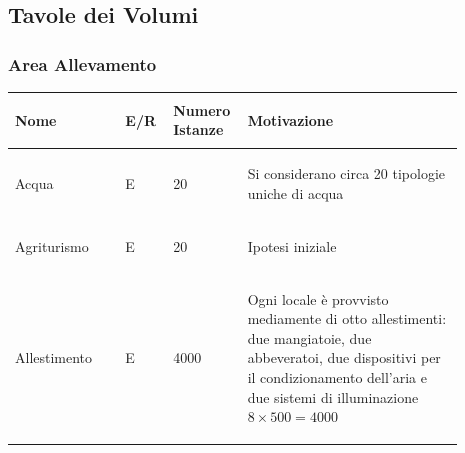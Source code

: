 \documentclass[12pt,a4paper]{article}
\begin{document}
\subsection{Tavole dei Volumi}
\label{sec:volumi}


\subsubsection{Area Allevamento}
\begin{center}
\setlength{\extrarowheight}{1.5pt}
\begin{longtable}{|p{0.23\linewidth}|p{0.1\linewidth}|p{0.11\linewidth}|p{0.45\linewidth}|}
\hline \textbf{Nome} 	& \begin{center}\vspace{-15pt}\textbf{E/R}\end{center} & \textbf{Numero Istanze} & \textbf{Motivazione}\\ 

    
\hline
Acqua 				& \begin{center}
\vspace{-25pt}E
\end{center}
					& \begin{center}
					\vspace{-25pt}20\end{center}
					& \begin{flushleft}\vspace{-25pt} Si considerano circa 20 tipologie uniche di acqua \end{flushleft}\\ 

\hline
Agriturismo 				& \begin{center}
\vspace{-25pt}E
\end{center}
					& \begin{center}
					\vspace{-25pt}20
					\end{center}
					& \begin{flushleft}\vspace{-25pt} Ipotesi iniziale \end{flushleft}\\ 

\hline
Allestimento 				& \begin{center}
\vspace{-25pt}E
\end{center}
					& \begin{center}
					\vspace{-25pt}4000\end{center}
					& \begin{flushleft}\vspace{-25pt} Ogni locale è provvisto mediamente di otto allestimenti: due mangiatoie, due abbeveratoi, due dispositivi per il condizionamento dell'aria e due sistemi di illuminazione $8\times 500 = 4000$\end{flushleft}\\ 


\end{longtable}
\end{center}
\end{document}
